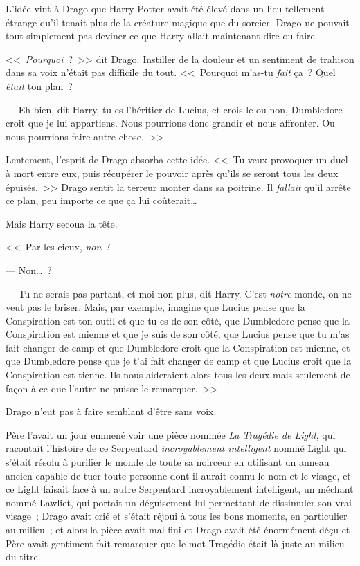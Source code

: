 L'idée vint à Drago que Harry Potter avait été élevé dans un lieu tellement étrange qu'il tenait plus de la créature magique que du sorcier. Drago ne pouvait tout simplement pas deviner ce que Harry allait maintenant dire ou faire.

<<~\emph{Pourquoi}~?~>> dit Drago. Instiller de la douleur et un sentiment de trahison dans sa voix n'était pas difficile du tout. <<~Pourquoi m'as-tu \emph{fait} ça~? Quel \emph{était} ton plan~?

--- Eh bien, dit Harry, tu es l'héritier de Lucius, et crois-le ou non, Dumbledore croit que je lui appartiens. Nous pourrions donc grandir et nous affronter. Ou nous pourrions faire autre chose.~>>

Lentement, l'esprit de Drago absorba cette idée. <<~Tu veux provoquer un duel à mort entre eux, puis récupérer le pouvoir après qu'ils se seront tous les deux épuisés.~>> Drago sentit la terreur monter dans sa poitrine. Il \emph{fallait} qu'il arrête ce plan, peu importe ce que ça lui coûterait…

Mais Harry secoua la tête.

<<~Par les cieux, \emph{non~!}

--- Non…~?

--- Tu ne serais pas partant, et moi non plus, dit Harry. C'est \emph{notre} monde, on ne veut pas le briser. Mais, par exemple, imagine que Lucius pense que la Conspiration est ton outil et que tu es de son côté, que Dumbledore pense que la Conspiration est mienne et que je suis de son côté, que Lucius pense que tu m'as fait changer de camp et que Dumbledore croit que la Conspiration est mienne, et que Dumbledore pense que je t'ai fait changer de camp et que Lucius croit que la Conspiration est tienne. Ils nous aideraient alors tous les deux mais seulement de façon à ce que l'autre ne puisse le remarquer.~>>

Drago n'eut pas à faire semblant d'être sans voix.

Père l'avait un jour emmené voir une pièce nommée \emph{La Tragédie de Light}, qui racontait l'histoire de ce Serpentard \emph{incroyablement intelligent} nommé Light qui s'était résolu à purifier le monde de toute sa noirceur en utilisant un anneau ancien capable de tuer toute personne dont il aurait connu le nom et le visage, et ce Light faisait face à un autre Serpentard incroyablement intelligent, un méchant nommé Lawliet, qui portait un déguisement lui permettant de dissimuler son vrai visage~; Drago avait crié et s'était réjoui à tous les bons moments, en particulier au milieu~; et alors la pièce avait mal fini et Drago avait été énormément déçu et Père avait gentiment fait remarquer que le mot Tragédie était là juste au milieu du titre.

